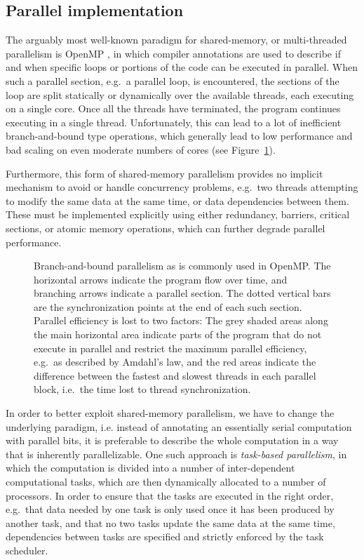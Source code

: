 \documentclass[final]{siamltex}
\newcommand{\fig}[1]
    {Figure~\ref{fig:#1}}
\begin{document}
\subsection{Parallel implementation}

The arguably most well-known paradigm for shared-memory,
or multi-threaded parallelism is OpenMP \cite{ref:Dagum1998},
in which compiler annotations are used to describe if and when
specific loops or portions of the code can be executed
in parallel.
When such a parallel section, e.g.~a parallel loop, is
encountered, the sections of the loop are split statically
or dynamically over the available threads, each executing
on a single core.
Once all the threads have terminated, the program continues
executing in a single thread.
Unfortunately, this can lead to a lot of inefficient
branch-and-bound
type operations, which generally lead to low performance and
bad scaling on even moderate numbers of cores (see \fig{OMPScaling}).

Furthermore, this form of shared-memory parallelism provides
no implicit mechanism to avoid or handle concurrency problems,
e.g.~two threads attempting to modify the same data at the same time,
or data dependencies between them.
These must be implemented explicitly using either redundancy, barriers,
critical sections, or atomic memory operations, which can further degrade
parallel performance.

\begin{figure}
    \centerline{}
    
    \caption{Branch-and-bound parallelism as is commonly used in OpenMP.
        The horizontal arrows indicate the program flow over time, and
        branching arrows indicate a parallel section. The dotted vertical
        bars are the synchronization points at the end of each such section.
        Parallel efficiency is lost to two factors: The grey shaded areas
        along the main horizontal area indicate parts of the program that
        do not execute in parallel and restrict the maximum parallel
        efficiency, e.g.~as described by Amdahl's law, and the red
        areas indicate the difference between the fastest and slowest
        threads in each parallel block, i.e.~the time lost to
        thread synchronization.
        }
    \label{fig:OMPScaling}
\end{figure}


In order to better exploit shared-memory parallelism, 
we have to change the underlying paradigm, i.e. instead
of annotating an essentially serial computation with parallel
bits, it is preferable to describe the whole computation in a way that
is inherently parallelizable.
One such approach is {\em task-based parallelism}, in which the
computation is divided into a number of inter-dependent
computational tasks, which are then dynamically allocated
to a number of processors.
In order to ensure that the tasks are executed in the right
order, e.g.~that data needed by one task is only used once it
has been produced by another task, and that no two tasks
update the same data at the same time, dependencies between
tasks are specified and strictly enforced by the task
scheduler.
\end{document}
